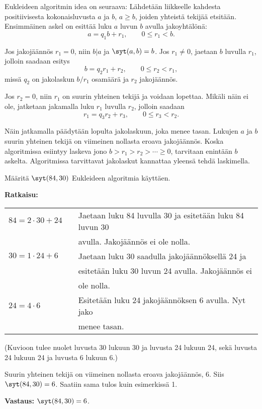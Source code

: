 

Eukleideen algoritmin idea on seuraava: Lähdetään liikkeelle kahdesta positiivisesta kokonaisluvusta $a$ ja $b$, $a\ge b$, joiden yhteistä tekijää etsitään. Ensimmäinen askel on esittää luku $a$ luvun $b$ avulla jakoyhtälönä:
\[
a=q_1b + r_1, \qquad 0 \le r_1 < b.
\]

Jos jakojäännös $r_1=0$, niin $b|a$ ja $\syt(a,b)=b$. Jos $r_1\neq 0$, jaetaan $b$ luvulla $r_1$, jolloin saadaan esitys
\[
b= q_2r_1+r_2, \qquad 0 \le r_2 < r_1,
\]
missä $q_2$ on jakolaskun $b/r_1$ osamäärä ja $r_2$ jakojäännös.

Jos $r_2=0$, niin $r_1$ on suurin yhteinen tekijä ja voidaan lopettaa. Mikäli näin ei ole, jatketaan jakamalla luku $r_1$ luvulla $r_2$, jolloin saadaan
\[
r_1 = q_3r_2 + r_3, \qquad 0 \le r_3 < r_2.
\]

Näin jatkamalla päädytään lopulta jakolaskuun, joka menee tasan. Lukujen $a$ ja $b$ suurin yhteinen tekijä on viimeinen nollasta eroava jakojäännös. Koska algoritmissa esiintyy laskeva jono $b>r_1>r_2> \cdots \ge 0$, tarvitaan enintään $b$ askelta. Algoritmissa tarvittavat jakolaskut kannattaa yleensä tehdä laskimella.

\begin{esimerkki}
Määritä $\syt(84, 30)$ Eukleideen
algoritmia käyttäen.

{\bf Ratkaisu:}

\begin{tabular}{lcl}
$84 = 2 \cdot 30 + 24$ & &
Jaetaan luku 84 luvulla 30 ja esitetään luku 84 luvun 30
\\
&& avulla. Jakojäännös ei ole nolla.\\
$30 = 1 \cdot 24 + 6$ & & Jaetaan luku 30 saadulla
jakojäännöksellä 24 ja \\
&& esitetään luku 30 luvun 24 avulla. Jakojäännös ei \\
&& ole nolla. \\
$24 = 4 \cdot 6$ & & Esitetään luku 24 jakojäännöksen 6
avulla. Nyt jako \\
&& menee tasan.
\end{tabular}

(Kuvioon tulee nuolet luvusta 30 lukuun 30 ja luvusta 24
lukuun 24, sekä luvusta 24
lukuun 24 ja luvusta 6 lukuun 6.)

Suurin yhteinen tekijä on viimeinen nollasta eroava
jakojäännös, $6$. Siis $\syt(84, 30) = 6$. Saatiin sama
tulos kuin esimerkissä 1.

{\bf Vastaus:} $\syt(84, 30) = 6$.
\end{esimerkki}

